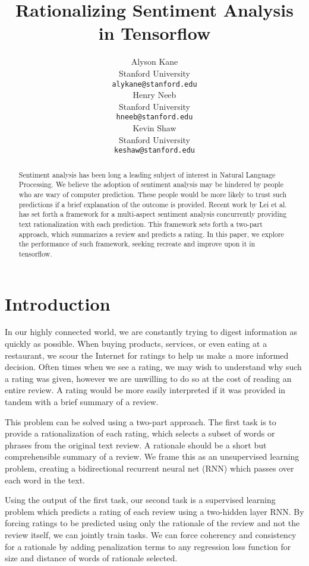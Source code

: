 \documentclass{article} %
\title{Rationalizing Sentiment Analysis in Tensorflow}
\author{
Alyson Kane \\
Stanford University\\
\texttt{alykane@stanford.edu} \\
\And
Henry Neeb \\
Stanford University\\
\texttt{hneeb@stanford.edu}\\
\And
Kevin Shaw \\
Stanford University\\
\texttt{keshaw@stanford.edu}\\
}
\begin{document}
\maketitle

\begin{abstract}

Sentiment analysis has been long a leading subject of interest in Natural Language Processing. We believe the adoption of sentiment analysis may be hindered by people who are wary of computer prediction. These people would be more likely to trust such predictions if a brief explanation of the outcome is provided. Recent work by Lei et al. has set forth a framework for a multi-aspect sentiment analysis concurrently providing text rationalization with each prediction. This framework sets forth a two-part approach, which summarizes a review and predicts a rating. In this paper, we explore the performance of such framework, seeking  recreate and improve upon it in tensorflow.
\end{abstract}

\section{Introduction}
In our highly connected world, we are constantly trying to digest information as quickly as possible. When buying products, services, or even eating at a restaurant, we scour the Internet for ratings to help us make a more informed decision. Often times when we see a rating, we may wish to understand why such a rating was given, however we are unwilling to do so at the cost of reading an entire review. A rating would be more easily interpreted if it was provided in tandem with a brief summary of a review. 

This problem can be solved using a two-part approach. The first task is to provide a rationalization of each rating, which selects a subset of words or phrases from the original text review. A rationale should be a short but comprehensible summary of a review. We frame this as an unsupervised learning problem, creating a bidirectional recurrent neural net (RNN) which passes over each word in the text.   

Using the output of the first task, our second task is a supervised learning problem which predicts a rating of each review using a two-hidden layer RNN. By forcing ratings to be predicted using only the rationale of the review and not the review itself, we can jointly train tasks. We can force coherency and consistency for a rationale by adding penalization terms to any regression loss function for size and distance of words of rationale selected. 
\end{document}
